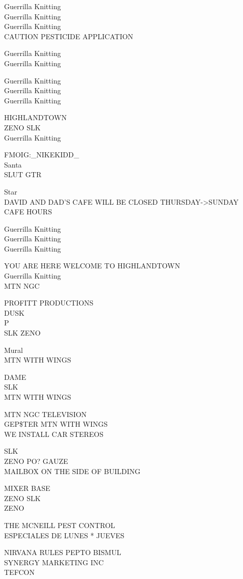 \documentclass[10pt,letterpaper]{article}
\begin{document}
Guerrilla Knitting\\
Guerrilla Knitting\\
Guerrilla Knitting\\
CAUTION PESTICIDE APPLICATION

Guerrilla Knitting\\
Guerrilla Knitting

Guerrilla Knitting\\
Guerrilla Knitting\\
Guerrilla Knitting

HIGHLANDTOWN\\
ZENO SLK\\
Guerrilla Knitting

FMOIG:\_NIKEKIDD\_\\
Santa\\
SLUT GTR

Star\\
DAVID AND DAD'S CAFE WILL BE CLOSED THURSDAY{-}>SUNDAY\\
CAFE HOURS

Guerrilla Knitting\\
Guerrilla Knitting\\
Guerrilla Knitting

YOU ARE HERE WELCOME TO HIGHLANDTOWN\\
Guerrilla Knitting\\
MTN NGC

PROFITT PRODUCTIONS\\
DUSK\\
P\\
SLK ZENO

Mural\\
MTN WITH WINGS

DAME\\
SLK\\
MTN WITH WINGS

MTN NGC TELEVISION\\
GEP\$TER MTN WITH WINGS\\
WE INSTALL CAR STEREOS

SLK\\
ZENO PO? GAUZE\\
MAILBOX ON THE SIDE OF BUILDING

MIXER BASE\\
ZENO SLK\\
ZENO

THE MCNEILL PEST CONTROL\\
ESPECIALES DE LUNES * JUEVES

NIRVANA RULES PEPTO BISMUL\\
SYNERGY MARKETING INC\\
TEFCON
\end{document}
